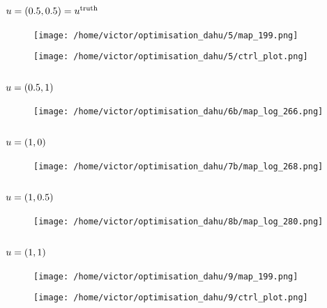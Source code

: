 \documentclass[../../Main_ManuscritThese.tex]{subfiles}
\begin{document}
\subsection*{$u=(0.5, 0.5) = u^{\mathrm{truth}}$}
\begin{figure}[ht]
  \centering
  \texttt{[image: /home/victor/optimisation\_dahu/5/map\_199.png]}
\end{figure}
\begin{figure}[ht]
  \centering
  \texttt{[image: /home/victor/optimisation\_dahu/5/ctrl\_plot.png]}
\end{figure}
\clearpage
\subsection*{$u=(0.5, 1)$}
\begin{figure}[ht]
  \centering
  \texttt{[image: /home/victor/optimisation\_dahu/6b/map\_log\_266.png]}
\end{figure}
\begin{figure}[ht]
  \centering
    \resizebox{1\textwidth}{!}{}
\end{figure}
\clearpage
\subsection*{$u=(1, 0)$}

\begin{figure}[ht]
  \centering
  \texttt{[image: /home/victor/optimisation\_dahu/7b/map\_log\_268.png]}
\end{figure}
\begin{figure}[ht]
  \centering
  \resizebox{1\textwidth}{!}{}
\end{figure}
\clearpage
\subsection*{$u=(1, 0.5)$}
\begin{figure}[ht]
  \centering
  \texttt{[image: /home/victor/optimisation\_dahu/8b/map\_log\_280.png]}
\end{figure}
\begin{figure}[ht]
  \centering
    \resizebox{1\textwidth}{!}{}
\end{figure}
\clearpage
\subsection*{$u=(1, 1)$}
\begin{figure}[ht]
  \centering
  \texttt{[image: /home/victor/optimisation\_dahu/9/map\_199.png]}
\end{figure}
\begin{figure}[ht]
  \centering
  \texttt{[image: /home/victor/optimisation\_dahu/9/ctrl\_plot.png]}
\end{figure}
\clearpage




\pagestyle{appendixStyle}



\subfileLocal{
	\pagestyle{empty}
	
	

}

\endgroup
\end{document}
